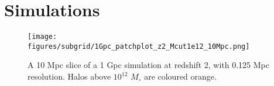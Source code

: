 
\section{Simulations}
\label{ch:signal:sec:sims}

\begin{figure}[H] %
\begin{center}
\texttt{[image: figures/subgrid/1Gpc\_patchplot\_z2\_Mcut1e12\_10Mpc.png]}%
\caption{A 10 Mpc slice of a 1 Gpc simulation at redshift 2, with 0.125 Mpc resolution. Halos above $10^{12}$ $M_\circ$ are coloured orange.}
\label{musicslice}
\end{center}
\end{figure}


